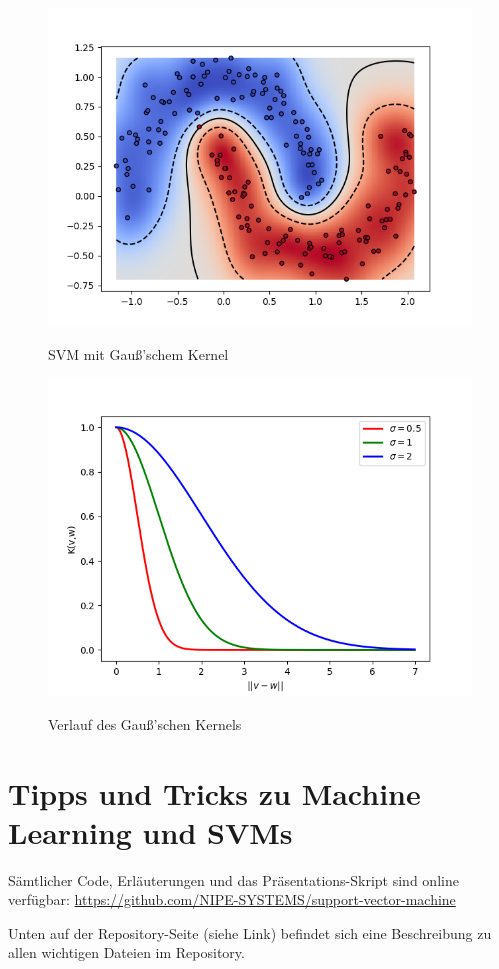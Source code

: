 \documentclass[10pt,a4paper]{scrartcl}
\begin{document}
\begin{figure}[ht]
\begin{minipage}[b]{0.5\linewidth}
                        \centering
                        \includegraphics[width=.8\textwidth]{img_kernel/kernelGau.png}
                        \caption{SVM mit Gauß'schem Kernel}
                        \vspace{4ex}
                        \label{ker:gau}
                    \end{minipage}
                    \begin{minipage}[b]{0.5\linewidth}
                        \centering
                        \includegraphics[width=.8\textwidth]{img_kernel/sigmaGau.png}
                        \caption{Verlauf des Gauß'schen Kernels}
                        \vspace{4ex}
                        \label{ker:sig}
                    \end{minipage}
                \end{figure}

        \section{Tipps und Tricks zu Machine Learning und SVMs}
            Sämtlicher Code, Erläuterungen und das Präsentations-Skript sind online verfügbar: \url{https://github.com/NIPE-SYSTEMS/support-vector-machine}
            
            Unten auf der Repository-Seite (siehe Link) befindet sich eine Beschreibung zu allen wichtigen Dateien im Repository.


\end{document}
